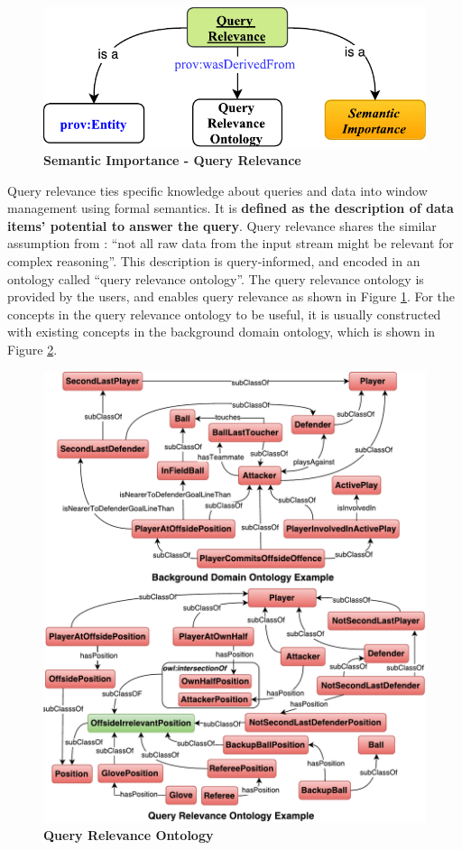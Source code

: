 \begin{figure}[!htbp]
	\centering
    \includegraphics[width=5in]{img/3-siqr.pdf}
    \caption{\textbf{Semantic Importance - Query Relevance}}
    \label{fig:3-siqr}
\end{figure}
Query relevance ties specific knowledge about queries and data into window management using formal semantics. 
It is \textbf{defined as the description of data items' potential to answer the query}.
Query relevance shares the similar assumption from \cite{mileo2013streamrule}: 
``not all raw data from the input stream might be relevant for complex reasoning''.
This description is query-informed, and encoded in an ontology called ``query relevance ontology''.
The query relevance ontology is provided by the users, and enables query relevance as shown in Figure \ref{fig:3-siqr}.
For the concepts in the query relevance ontology to be useful, it is usually constructed with existing concepts in the background domain ontology, which is shown in Figure \ref{fig:3-siqreo}.

\begin{figure}[!htbp]
	\centering
    \includegraphics[width=5in]{img/3-siqreo.pdf}
    \caption{\textbf{Query Relevance Ontology}}
    \label{fig:3-siqreo}
\end{figure}

